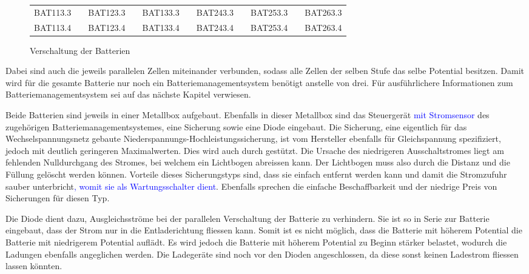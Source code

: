 \begin{figure}[h]
\begin{tabular}{lp{2mm}lp{2mm}lp{1.5cm}lp{2mm}lp{2mm}l}
\multicolumn{1}{|l|}{BAT113.3} & \multicolumn{1}{l|}{} & \multicolumn{1}{l|}{BAT123.3} & \multicolumn{1}{l|}{} & \multicolumn{1}{l|}{BAT133.3} & \multicolumn{1}{l|}{} & \multicolumn{1}{l|}{BAT243.3} & \multicolumn{1}{l|}{} & \multicolumn{1}{l|}{BAT253.3} & \multicolumn{1}{l|}{} & \multicolumn{1}{l|}{BAT263.3} \\ \cline{1-1} \cline{3-3} \cline{5-5} \cline{7-7} \cline{9-9} \cline{11-11} 
\multicolumn{1}{|l|}{BAT113.4} & \multicolumn{1}{l|}{} & \multicolumn{1}{l|}{BAT123.4} & \multicolumn{1}{l|}{} & \multicolumn{1}{l|}{BAT133.4} & \multicolumn{1}{l|}{} & \multicolumn{1}{l|}{BAT243.4} & \multicolumn{1}{l|}{} & \multicolumn{1}{l|}{BAT253.4} & \multicolumn{1}{l|}{} & \multicolumn{1}{l|}{BAT263.4} \\ \cline{1-1} \cline{3-3} \cline{5-5} \cline{7-7} \cline{9-9} \cline{11-11} 
\end{tabular}
	\caption{Verschaltung der Batterien}
	\label{fig:schema_batterie}
\end{figure}

Dabei sind auch die jeweils parallelen Zellen miteinander verbunden, sodass alle Zellen der selben Stufe das selbe Potential besitzen. Damit wird für die gesamte Batterie nur noch ein Batteriemanagementsystem benötigt anstelle von drei. Für ausführlichere Informationen zum Batteriemanagementsystem sei auf das nächste Kapitel verwiesen.

Beide Batterien sind jeweils in einer Metallbox aufgebaut. Ebenfalls in dieser Metallbox sind das Steuergerät \textcolor{blue}{mit Stromsensor} des zugehörigen Batteriemanagementsystemes, eine Sicherung sowie eine Diode eingebaut. Die Sicherung, eine eigentlich für das Wechselspannungsnetz gebaute Niederspannungs-Hochleistungssicherung, ist vom Hersteller ebenfalls für Gleichspannung spezifiziert, jedoch mit deutlich geringeren Maximalwerten. Dies wird auch durch \cite{siba} gestützt. Die Ursache des niedrigeren Ausschaltstromes liegt am fehlenden Nulldurchgang des Stromes, bei welchem ein Lichtbogen abreissen kann. Der Lichtbogen muss also durch die Distanz und die Füllung gelöscht werden können. Vorteile dieses Sicherungstyps sind, dass sie einfach entfernt werden kann und damit die Stromzufuhr sauber unterbricht\textcolor{blue}{, womit sie als Wartungsschalter dient}. Ebenfalls sprechen die einfache Beschaffbarkeit und der niedrige Preis von Sicherungen für diesen Typ.

Die Diode dient dazu, Ausgleichsströme bei der parallelen Verschaltung der Batterie zu verhindern. Sie ist so in Serie zur Batterie eingebaut, dass der Strom nur in die Entladerichtung fliessen kann. Somit ist es nicht möglich, dass die Batterie mit höherem Potential die Batterie mit niedrigerem Potential auflädt. Es wird jedoch die Batterie mit höherem Potential zu Beginn stärker belastet, wodurch die Ladungen ebenfalls angeglichen werden. Die Ladegeräte sind noch vor den Dioden angeschlossen, da diese sonst keinen Ladestrom fliessen lassen könnten.

